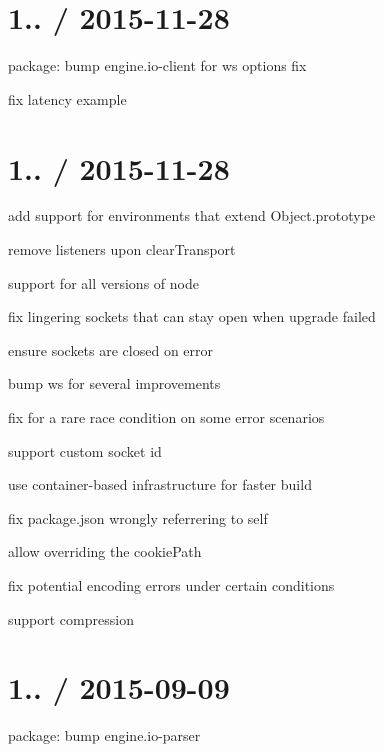 \section*{1.. / 2015-\/11-\/28 }


\begin{DoxyItemize}
\item package\+: bump {\ttfamily engine.\+io-\/client} for {\ttfamily ws} options fix
\item fix {\ttfamily latency} example
\end{DoxyItemize}

\section*{1.. / 2015-\/11-\/28 }


\begin{DoxyItemize}
\item add support for environments that extend {\ttfamily Object.\+prototype}
\item remove listeners upon {\ttfamily clear\+Transport}
\item support for all versions of node
\item fix lingering sockets that can stay open when upgrade failed
\item ensure sockets are closed on error
\item bump {\ttfamily ws} for several improvements
\item fix for a rare race condition on some error scenarios
\item support custom socket id
\item use container-\/based infrastructure for faster build
\item fix package.\+json wrongly referrering to self
\item allow overriding the {\ttfamily cookie\+Path}
\item fix potential encoding errors under certain conditions
\item support compression
\end{DoxyItemize}

\section*{1.. / 2015-\/09-\/09 }


\begin{DoxyItemize}
\item package\+: bump {\ttfamily engine.\+io-\/parser}
\end{DoxyItemize}

